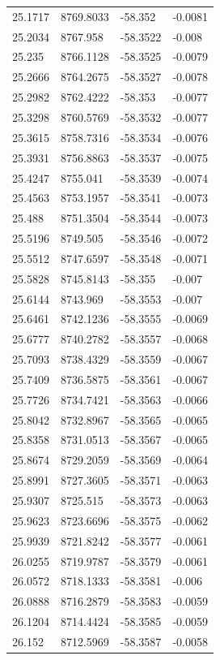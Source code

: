 \begin{table}[H]
\begin{tabular}{llll}
25.1717 & 8769.8033 & -58.352 & -0.0081 \\
25.2034 & 8767.958 & -58.3522 & -0.008 \\
25.235 & 8766.1128 & -58.3525 & -0.0079 \\
25.2666 & 8764.2675 & -58.3527 & -0.0078 \\
25.2982 & 8762.4222 & -58.353 & -0.0077 \\
25.3298 & 8760.5769 & -58.3532 & -0.0077 \\
25.3615 & 8758.7316 & -58.3534 & -0.0076 \\
25.3931 & 8756.8863 & -58.3537 & -0.0075 \\
25.4247 & 8755.041 & -58.3539 & -0.0074 \\
25.4563 & 8753.1957 & -58.3541 & -0.0073 \\
25.488 & 8751.3504 & -58.3544 & -0.0073 \\
25.5196 & 8749.505 & -58.3546 & -0.0072 \\
25.5512 & 8747.6597 & -58.3548 & -0.0071 \\
25.5828 & 8745.8143 & -58.355 & -0.007 \\
25.6144 & 8743.969 & -58.3553 & -0.007 \\
25.6461 & 8742.1236 & -58.3555 & -0.0069 \\
25.6777 & 8740.2782 & -58.3557 & -0.0068 \\
25.7093 & 8738.4329 & -58.3559 & -0.0067 \\
25.7409 & 8736.5875 & -58.3561 & -0.0067 \\
25.7726 & 8734.7421 & -58.3563 & -0.0066 \\
25.8042 & 8732.8967 & -58.3565 & -0.0065 \\
25.8358 & 8731.0513 & -58.3567 & -0.0065 \\
25.8674 & 8729.2059 & -58.3569 & -0.0064 \\
25.8991 & 8727.3605 & -58.3571 & -0.0063 \\
25.9307 & 8725.515 & -58.3573 & -0.0063 \\
25.9623 & 8723.6696 & -58.3575 & -0.0062 \\
25.9939 & 8721.8242 & -58.3577 & -0.0061 \\
26.0255 & 8719.9787 & -58.3579 & -0.0061 \\
26.0572 & 8718.1333 & -58.3581 & -0.006 \\
26.0888 & 8716.2879 & -58.3583 & -0.0059 \\
26.1204 & 8714.4424 & -58.3585 & -0.0059 \\
26.152 & 8712.5969 & -58.3587 & -0.0058 \\

\end{tabular}
\end{table}

